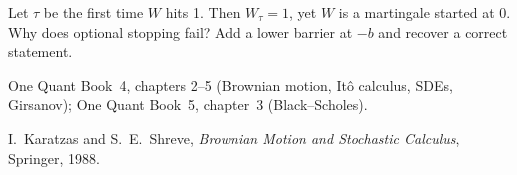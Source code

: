 \begin{interviewq}\label{iq:iv:stochastic-calculus:13}
Let $\tau$ be the first time $W$ hits 1. Then $W_\tau = 1$, yet $W$ is a martingale started at 0. Why does optional
stopping fail? Add a lower barrier at $-b$ and recover a correct statement.
\end{interviewq}

\begin{omsources}
\item One Quant Book~4, chapters 2--5 (Brownian motion, Itô calculus, SDEs, Girsanov); One Quant Book~5, chapter~3
(Black--Scholes).
\item I.~Karatzas and S.~E.~Shreve, \emph{Brownian Motion and Stochastic Calculus}, Springer, 1988.
\end{omsources}
